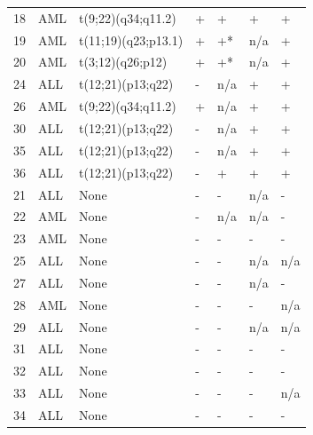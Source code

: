\begin{table}[H]
\begin{minipage}{\textwidth}
{\begin{tabulary}{\linewidth}{p{1cm}p{1.2cm}p{2.3cm}p{1.2cm}p{1cm}p{1cm}p{0.9cm}}
			\rule{0pt}{1ex} 18 & AML & t(9;22)(q34;q11.2) & + & + & + & + \\
			\rule{0pt}{1ex} 19 & AML & t(11;19)(q23;p13.1) & + & +* & n/a & + \\
			\rule{0pt}{1ex} 20 & AML & t(3;12)(q26;p12) & + & +* & n/a & + \\
			\rule{0pt}{1ex} 24 & ALL & t(12;21)(p13;q22) & - & n/a & + & + \\
			\rule{0pt}{1ex} 26 & AML & t(9;22)(q34;q11.2) & + & n/a & + & + \\
			\rule{0pt}{1ex} 30 & ALL & t(12;21)(p13;q22) & - & n/a & + & + \\
			\rule{0pt}{1ex} 35 & ALL & t(12;21)(p13;q22) & - & n/a & + & + \\
			\rule{0pt}{1ex} 36 & ALL & t(12;21)(p13;q22) & - & + & + & + \\
			\rule{0pt}{1ex} 21 & ALL & None & - & - & n/a & - \\
			\rule{0pt}{1ex} 22 & AML & None & - & n/a & n/a & - \\
			\rule{0pt}{1ex} 23 & AML & None & - & - & - & - \\
			\rule{0pt}{1ex} 25 & ALL & None & - & - & n/a & n/a \\
			\rule{0pt}{1ex} 27 & ALL & None & - & - & n/a & - \\
			\rule{0pt}{1ex} 28 & AML & None & - & - & - & n/a \\
			\rule{0pt}{1ex} 29 & ALL & None & - & - & n/a & n/a \\
			\rule{0pt}{1ex} 31 & ALL & None & - & - & - & - \\
			\rule{0pt}{1ex} 32 & ALL & None & - & - & - & - \\
			\rule{0pt}{1ex} 33 & ALL & None & - & - & - & n/a \\
			\rule{0pt}{1ex} 34 & ALL & None & - & - & - & - \\
			\hline
	\end{tabulary}}
\end{minipage}
\end{table}

